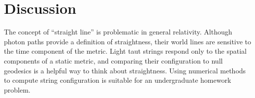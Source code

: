\documentclass{ws-tpe}
\begin{document}
\section{Discussion}

The concept of ``straight line'' is problematic in general relativity.
Although photon paths provide a definition of straightness, their
world lines are sensitive to the time component of the metric.  Light
taut strings respond only to the spatial components of a static
metric, and comparing their configuration to null geodesics is a
helpful way to think about straightness.  Using numerical methods to
compute string configuration is suitable for an undergraduate homework
problem.



\end{document}
